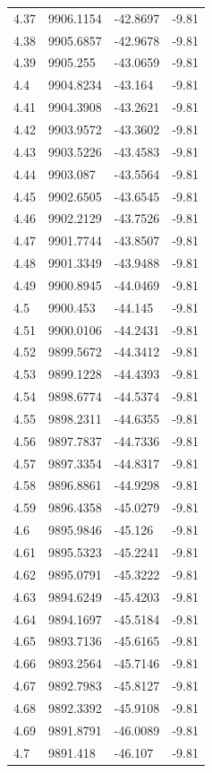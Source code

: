 \begin{table}[H]
\begin{tabular}{llll}
4.37 & 9906.1154 & -42.8697 & -9.81 \\
4.38 & 9905.6857 & -42.9678 & -9.81 \\
4.39 & 9905.255 & -43.0659 & -9.81 \\
4.4 & 9904.8234 & -43.164 & -9.81 \\
4.41 & 9904.3908 & -43.2621 & -9.81 \\
4.42 & 9903.9572 & -43.3602 & -9.81 \\
4.43 & 9903.5226 & -43.4583 & -9.81 \\
4.44 & 9903.087 & -43.5564 & -9.81 \\
4.45 & 9902.6505 & -43.6545 & -9.81 \\
4.46 & 9902.2129 & -43.7526 & -9.81 \\
4.47 & 9901.7744 & -43.8507 & -9.81 \\
4.48 & 9901.3349 & -43.9488 & -9.81 \\
4.49 & 9900.8945 & -44.0469 & -9.81 \\
4.5 & 9900.453 & -44.145 & -9.81 \\
4.51 & 9900.0106 & -44.2431 & -9.81 \\
4.52 & 9899.5672 & -44.3412 & -9.81 \\
4.53 & 9899.1228 & -44.4393 & -9.81 \\
4.54 & 9898.6774 & -44.5374 & -9.81 \\
4.55 & 9898.2311 & -44.6355 & -9.81 \\
4.56 & 9897.7837 & -44.7336 & -9.81 \\
4.57 & 9897.3354 & -44.8317 & -9.81 \\
4.58 & 9896.8861 & -44.9298 & -9.81 \\
4.59 & 9896.4358 & -45.0279 & -9.81 \\
4.6 & 9895.9846 & -45.126 & -9.81 \\
4.61 & 9895.5323 & -45.2241 & -9.81 \\
4.62 & 9895.0791 & -45.3222 & -9.81 \\
4.63 & 9894.6249 & -45.4203 & -9.81 \\
4.64 & 9894.1697 & -45.5184 & -9.81 \\
4.65 & 9893.7136 & -45.6165 & -9.81 \\
4.66 & 9893.2564 & -45.7146 & -9.81 \\
4.67 & 9892.7983 & -45.8127 & -9.81 \\
4.68 & 9892.3392 & -45.9108 & -9.81 \\
4.69 & 9891.8791 & -46.0089 & -9.81 \\
4.7 & 9891.418 & -46.107 & -9.81 \\

\end{tabular}
\end{table}
